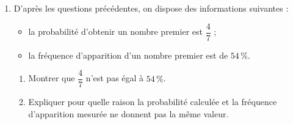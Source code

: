 \documentclass[exercice,a4]{thedocument}%
\begin{document}
\begin{enumerate}
	\begin{enumerate}
		\item En utilisant ce diagramme en bâtons, déterminer la fréquence d'apparition de la boule qui porte le numéro 2.
		\item Vérifier que la somme des fréquences d'apparition des boules dont le numéro est un nombre premier est égale à $54\,\%$.
	\end{enumerate}
	\item D'après les questions précédentes, on dispose des informations suivantes :
	\begin{itemize}
		\item la probabilité d'obtenir un nombre premier est $\dfrac{4}{7}$ ;
		\item la fréquence d'apparition d'un nombre premier est de $54\,\%$.
	\end{itemize}
	\begin{enumerate}
		\item Montrer que $\dfrac{4}{7}$ n'est pas égal à $54\,\%$.
		\item Expliquer pour quelle raison la probabilité calculée et la fréquence d'apparition mesurée ne donnent pas la même valeur.
	\end{enumerate}
\end{enumerate}

\medskip
\showthesource
\end{document}
